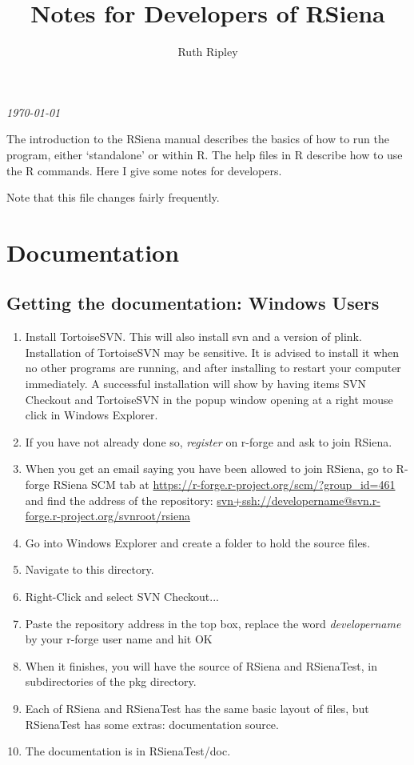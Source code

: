 \documentclass[12pt, a4paper]{article}
\renewcommand{\=}{\,=\,}
\newcommand{\+}{\,+\,}
\begin{document}
\title{Notes for Developers of RSiena}
\author{Ruth Ripley}
\date{}
\maketitle

\centerline{\emph{\today}}
\bigskip

The introduction to the RSiena manual describes the basics of how to run the
program, either `standalone' or within R. The help files in R describe how to
use the R commands. Here I give some notes for developers.

Note that this file changes fairly frequently.
\section{Documentation}
\subsection{Getting the documentation: Windows Users}
\begin{enumerate}
\item Install TortoiseSVN. This will also install \textsf{svn}
    and a version of \textsf{plink}.\\
    Installation of TortoiseSVN may be sensitive. It is advised to
    install it when no other programs are running, and after installing
    to restart your computer immediately.
    A successful installation will show by having items
    SVN Checkout and TortoiseSVN
    in the popup window opening at a right mouse click in Windows Explorer.
\item If you have not already done so, \emph{register} on r-forge and ask to
  join RSiena.
\item When you get an email saying you have been allowed to join RSiena,
  go to R-forge RSiena SCM tab at
  \url{https://r-forge.r-project.org/scm/?group_id=461} and find the address of
  the repository:
\url{svn+ssh://developername@svn.r-forge.r-project.org/svnroot/rsiena}
\item Go into Windows Explorer and create a folder to hold the source files.
\item Navigate to this directory.
\item Right-Click and select SVN Checkout...
\item Paste the repository address in the top box, replace the word
  \emph{developername} by your r-forge user name and hit OK
\item When it finishes, you will have the source of RSiena and RSienaTest, in
  subdirectories of the \textsf{pkg} directory.
\item Each of RSiena and RSienaTest has the same basic layout of files, but
  RSienaTest has some extras: documentation source.
\item The documentation is in RSienaTest/doc.
\end{enumerate}
\end{document}
